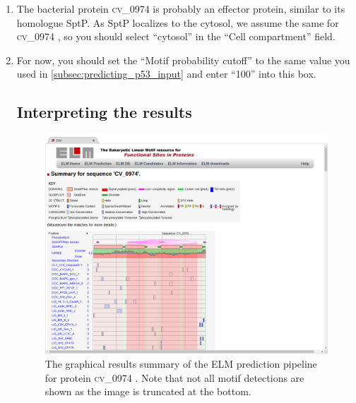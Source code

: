 \documentclass[12pt]{article}
\newcommand\uniprot[1]{%
	\textsc{\lowercase{#1}}%
}
\begin{document}
\begin{enumerate}

\item \label{subsec:predicting_cv_0974_search_compartment} The bacterial protein
\uniprot{CV\_0974} is probably an effector protein, similar to its homologue
SptP. As SptP localizes to the cytosol, we assume the same for \uniprot{CV\_0974},
so you should select ``cytosol'' in the ``Cell compartment'' field.


\item \label{subsec:predicting_cv_0974_search_cutoff} For now, you should set
    the ``Motif probability cutoff'' to the same value you used in
	\ref{subsec:predicting_p53_input} and enter ``100'' into this box.

\subsection*{Interpreting the results}
\label{subsec:predicting_cv_0974_submitting}

\begin{figure}[h!]
	\centering
	\includegraphics[width=\textwidth]{Figures/predicting_cv_0974/elm_results_summary_good.png}
	\caption{
	The graphical results summary of the ELM prediction pipeline for
	protein \uniprot{CV\_0974}. Note that not all motif
	detections are shown as the image is truncated at the bottom.
	}
	\label{fig:predicting_cv_0974_results_summary}
\end{figure}


\end{enumerate}
\end{document}
